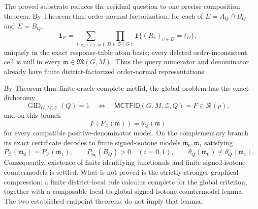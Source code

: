 The proved substrate reduces the residual question to one precise composition theorem.  By Theorem \(\mathrm{thm:order\text{-}normal\text{-}factorization}\), for each of \(E=A_Q\cap B_Q\) and \(E=B_Q\),
\[
 \mathbf 1_E
 =\sum_{t:e_E(t)=1}
   \prod_{D\in\mathcal D(G)}
   \mathbf 1\{(R_v)_{v\in D}=t_D\},
\]
uniquely in the exact response-table atom basis; every deleted order-inconsistent cell is null in every \(\mathfrak m\in\mathfrak M(G,M)\).  Thus the query numerator and denominator already have finite district-factorized order-normal representations.

By Theorem \(\mathrm{thm:finite\text{-}oracle\text{-}complete\text{-}mctfid}\), the global problem has the exact dichotomy
\[
 \operatorname{GID}_{G,M,\mathcal Z}(Q)=1
 \quad\Longleftrightarrow\quad
 \mathsf{MCTFID}(G,M,\mathcal Z,Q)=F\in\mathcal R(p),
\]
and on this branch
\[
 F(P_{\mathcal Z}(\mathfrak m))=\theta_Q(\mathfrak m)
\]
for every compatible positive-denominator model.  On the complementary branch its exact certificate decodes to finite signed-isotone models \(\mathfrak m_0,\mathfrak m_1\) satisfying
\[
 P_{\mathcal Z}(\mathfrak m_0)
 =P_{\mathcal Z}(\mathfrak m_1),
 \qquad
 P_{\mathfrak m_i}(B_Q)>0\quad(i=0,1),
 \qquad
 \theta_Q(\mathfrak m_0)\ne\theta_Q(\mathfrak m_1).
\]
Consequently, existence of finite identifying functionals and finite signed-isotone countermodels is settled.  What is not proved is the strictly stronger graphical compression: a finite district-local rule calculus complete for the global criterion, together with a composable local-to-global signed-isotone countermodel lemma.  The two established endpoint theorems do not imply that lemma.